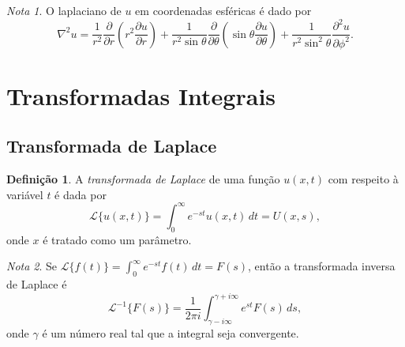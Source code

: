 \documentclass{article}
\theoremstyle{plain}
\theoremstyle{definition}
\newtheorem{defn}{Definição}[section]
\theoremstyle{remark}
\newtheorem*{rem}{Nota}
\begin{document}
\begin{rem}
    O laplaciano de \(u\) em coordenadas esféricas é dado por
    \begin{equation}
        \nabla^2 u = \frac{1}{r^2} \frac{\partial}{\partial r}\left(r^2 \frac{\partial u}{\partial r}\right) + \frac{1}{r^2 \sin\theta} \frac{\partial}{\partial \theta}\left(\sin\theta \frac{\partial u}{\partial \theta}\right) + \frac{1}{r^2 \sin^2\theta} \frac{\partial^2 u}{\partial \phi^2}.
    \end{equation}
\end{rem}

\section{Transformadas Integrais}

\subsection{Transformada de Laplace}

\begin{defn}
    A \emph{transformada de Laplace} de uma função \(u(x,t)\) com respeito à variável \(t\) é dada por
    \begin{equation}
        \mathcal{L}\{u(x,t)\} = \int_{0}^{\infty} e^{-st} u(x,t) \, dt = U(x,s),
    \end{equation}
    \noindent onde \(x\) é tratado como um parâmetro.
\end{defn}

\begin{rem}
    Se \(\mathcal{L}\{f(t)\} = \int_{0}^{\infty} e^{-st} f(t) \, dt = F(s)\), então a transformada inversa de Laplace é
    \begin{equation}
        \mathcal{L}^{-1}\{F(s)\} = \frac{1}{2\pi i} \int_{\gamma-i\infty}^{\gamma+i\infty} e^{st} F(s) \, ds,
    \end{equation}
    \noindent onde \(\gamma\) é um número real tal que a integral seja convergente.
\end{rem}
\end{document}
